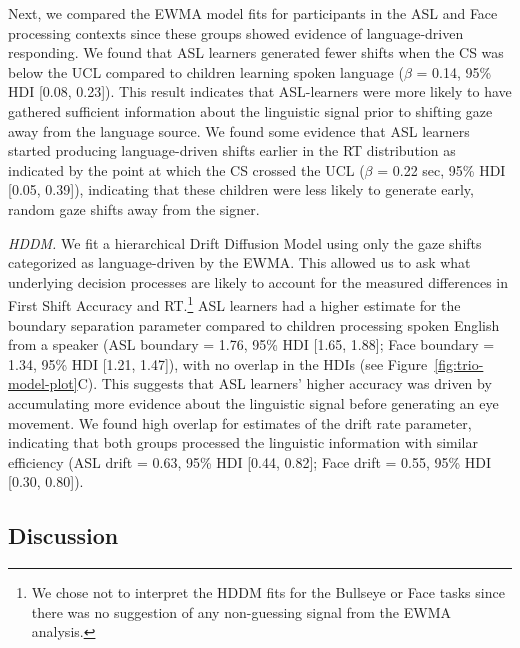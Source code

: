 \documentclass[,man,floatsintext]{apa6}
\let\rmarkdownfootnote\footnote%
\def\footnote{\protect\rmarkdownfootnote}
\begin{document}
Next, we compared the EWMA model fits for participants in the ASL and Face processing contexts since these groups showed evidence of language-driven responding. We found that ASL learners generated fewer shifts when the CS was below the UCL compared to children learning spoken language (\(\beta\) = 0.14, 95\% HDI {[}0.08, 0.23{]}). This result indicates that ASL-learners were more likely to have gathered sufficient information about the linguistic signal prior to shifting gaze away from the language source. We found some evidence that ASL learners started producing language-driven shifts earlier in the RT distribution as indicated by the point at which the CS crossed the UCL (\(\beta\) = 0.22 sec, 95\% HDI {[}0.05, 0.39{]}), indicating that these children were less likely to generate early, random gaze shifts away from the signer.

\emph{HDDM.} We fit a hierarchical Drift Diffusion Model using only the gaze shifts categorized as language-driven by the EWMA. This allowed us to ask what underlying decision processes are likely to account for the measured differences in First Shift Accuracy and RT.\footnote{We chose not to interpret the HDDM fits for the Bullseye or Face tasks since there was no suggestion of any non-guessing signal from the EWMA analysis.} ASL learners had a higher estimate for the boundary separation parameter compared to children processing spoken English from a speaker (ASL boundary = 1.76, 95\% HDI {[}1.65, 1.88{]}; Face boundary = 1.34, 95\% HDI {[}1.21, 1.47{]}), with no overlap in the HDIs (see Figure~\ref{fig:trio-model-plot}C). This suggests that ASL learners' higher accuracy was driven by accumulating more evidence about the linguistic signal before generating an eye movement. We found high overlap for estimates of the drift rate parameter, indicating that both groups processed the linguistic information with similar efficiency (ASL drift = 0.63, 95\% HDI {[}0.44, 0.82{]}; Face drift = 0.55, 95\% HDI {[}0.30, 0.80{]}).

\hypertarget{discussion}{%
\subsection{Discussion}\label{discussion}}
\end{document}
